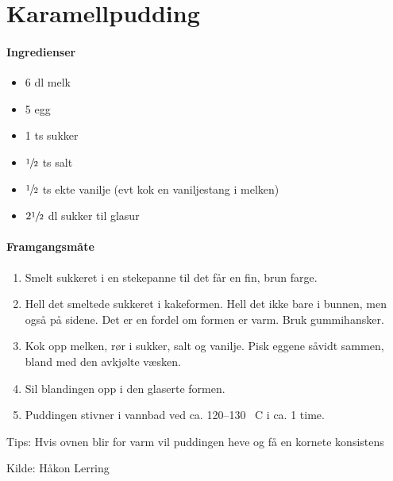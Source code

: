\section{Karamellpudding}

\paragraph{Ingredienser}
\begin{itemize}[noitemsep]
  \item 6 dl melk
  \item 5 egg
  \item 1 ts sukker
  \item $\sfrac{1}{2}$ ts salt
  \item $\sfrac{1}{2}$ ts ekte vanilje (evt kok en vaniljestang i melken)
  \item $2 \sfrac{1}{2}$ dl sukker til glasur
\end{itemize}

\paragraph{Framgangsmåte}
\begin{enumerate}
  \item Smelt sukkeret i en stekepanne til det får en fin, brun farge. \item Hell det smeltede sukkeret i kakeformen. Hell det ikke bare i bunnen, men også på sidene. Det er en fordel om formen er varm. Bruk gummihansker.
  \item Kok opp melken, rør i sukker, salt og vanilje. Pisk eggene såvidt sammen, bland med den avkjølte væsken.
  \item Sil blandingen opp i den glaserte formen.
  \item Puddingen stivner i vannbad ved ca. 120--130 \degree~C i ca. 1 time.

\end{enumerate}


Tips: Hvis ovnen blir for varm vil puddingen heve og få en kornete konsistens


Kilde: Håkon Lerring
